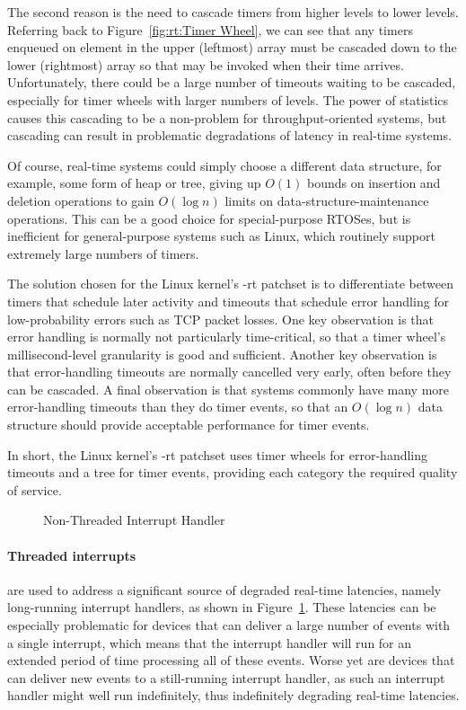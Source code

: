 The second reason is the need to cascade timers from higher levels to
lower levels.
Referring back to
Figure~\ref{fig:rt:Timer Wheel},
we can see that any timers enqueued on element  in the upper
(leftmost) array must be cascaded down to the lower (rightmost)
array so that may be invoked when their time arrives.
Unfortunately, there could be a large number of timeouts
waiting to be cascaded, especially for timer wheels with larger numbers
of levels.
The power of statistics causes this cascading to be a non-problem for
throughput-oriented systems, but cascading can result in problematic
degradations of latency in real-time systems.

Of course, real-time systems could simply choose a different data
structure, for example, some form of heap or tree, giving up
$O(1)$ bounds on insertion and deletion operations to gain $O(\log n)$
limits on data-structure-maintenance operations.
This can be a good choice for special-purpose RTOSes, but is inefficient
for general-purpose systems such as Linux, which routinely support
extremely large numbers of timers.

The solution chosen for the Linux kernel's -rt patchset is to differentiate
between timers that schedule later activity and timeouts that schedule
error handling for low-probability errors such as TCP packet losses.
One key observation is that error handling is normally not particularly
time-critical, so that a timer wheel's millisecond-level granularity
is good and sufficient.
Another key observation is that error-handling timeouts are normally
cancelled very early, often before they can be cascaded.
A final observation is that systems commonly have many more error-handling
timeouts than they do timer events, so that an $O(\log n)$
data structure should provide acceptable performance for timer events.

In short, the Linux kernel's -rt patchset uses timer wheels for
error-handling timeouts and a tree for timer events, providing each
category the required quality of service.

\begin{figure}[tb]
\centering
{}
\caption{Non-Threaded Interrupt Handler}
\label{fig:rt:Non-Threaded Interrupt Handler}
\end{figure}

\paragraph{Threaded interrupts}
are used to address a significant source of degraded real-time latencies,
namely long-running interrupt handlers,
as shown in
Figure~\ref{fig:rt:Non-Threaded Interrupt Handler}.
These latencies can be especially problematic for devices that can
deliver a large number of events with a single interrupt, which means
that the interrupt handler will run for an extended period of time
processing all of these events.
Worse yet are devices that can deliver new events to a still-running
interrupt handler, as such an interrupt handler might well run
indefinitely, thus indefinitely degrading real-time latencies.

